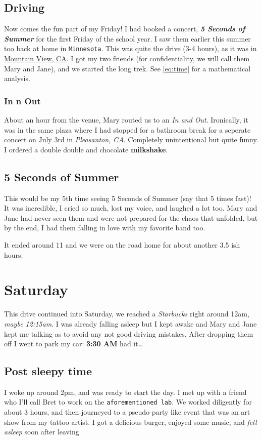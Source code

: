 \documentclass[12pt]{article} %
\begin{document}
\subsection{Driving}
Now comes the fun part of my Friday! I had booked a concert, \textbf{\textit{5 Seconds of Summer}} for the first Friday of the school year. I saw them earlier this summer too back at home in \texttt{Minnesota}. This was quite the drive (3-4 hours), as it was in \underline{Mountain View, CA}. I got my two friends (for confidentiality, we will call them Mary and Jane), and we started the long trek. See \eqref{eq:time} for a mathematical analysis.
\subsubsection{In n Out}
About an hour from the venue, Mary routed us to an \textit{In and Out}. Ironically, it was in the same plaza where I had stopped for a bathroom break for a seperate concert on July 3rd in \textit{Pleasanton, CA}. Completely unintentional but quite funny. I ordered a double double and chocolate \textbf{milkshake}.

\subsection{5 Seconds of Summer}
This would be my 5th time seeing 5 Seconds of Summer (say that 5 times fast)! It was incredible, I cried so much, lost my voice, and laughed a lot too. Mary and Jane had never seen them and were not prepared for the chaos that unfolded, but by the end, I had them falling in love with my favorite band too.

It ended around 11 and we were on the road home for about another 3.5 ish hours.
\section{Saturday}
This drive continued into Saturday, we reached a \textit{Starbucks} right around 12am, \emph{maybe 12:15am}. I was already falling asleep but I kept awake and Mary and Jane kept me talking as to avoid any not good driving mistakes. After dropping them off I went to park my car: \textbf{3:30 AM} had it\dots

\subsection{Post sleepy time}
I woke up around 2pm, and was ready to start the day. I met up with a friend who I'll call Bret to work on the \texttt{aforementioned lab}. We worked diligently for about 3 hours, and then journeyed to a pseudo-party like event that was an art show from my tattoo artist. I got a delicious burger, enjoyed some music, and \textit{fell asleep} soon after leaving
\end{document}
